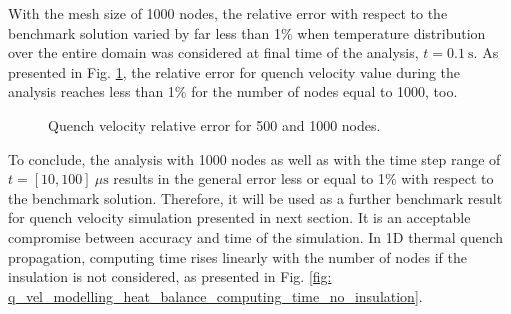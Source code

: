With the mesh size of 1000 nodes, the relative error with respect to the benchmark solution varied by far less than 1\% when temperature distribution over the entire domain was considered at final time of the analysis, $t = 0.1~\text{s}$. As presented in Fig. \ref{fig: q_vel_modelling_v_quench_rel_error_no_insulation}, the relative error for quench velocity value during the analysis reaches less than 1\% for the number of nodes equal to 1000, too. 

\begin{figure}[h!]
\centering
    \caption{Quench velocity relative error for 500 and 1000 nodes.}
    \label{fig: q_vel_modelling_v_quench_rel_error_no_insulation}
\end{figure}

To conclude, the analysis with 1000 nodes as well as with the time step range of $t=[10, 100]~\mu \text{s}$ results in the general error less or equal to 1\% with respect to the benchmark solution. Therefore, it will be used as a further benchmark result for quench velocity simulation presented in next section. It is an acceptable compromise between  accuracy and time of the simulation. In 1D thermal quench propagation, computing time rises linearly with the number of nodes if the insulation is not considered, as presented in Fig. \ref{fig: q_vel_modelling_heat_balance_computing_time_no_insulation}.

